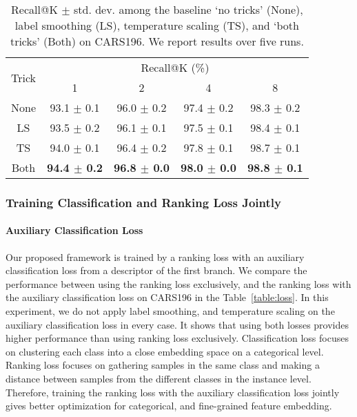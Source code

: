 \documentclass[10pt,twocolumn,letterpaper]{article}
\begin{document}
\begin{CJK}{UTF8}{mj}
\begin{table}[t!]
\begin{center}

\begin{adjustbox}{width=.95\columnwidth,center}
\begin{tabular}{c|cccc}
\hline
\multirow{2}{*}{Trick} & \multicolumn{4}{c}{Recall@K (\%)}                     \\ \cline{2-5} 
                       & 1          & 2          & 4          & 8          \\ \hline\hline
None                   & 93.1 $\pm$ 0.1 & 96.0 $\pm$ 0.2 & 97.4 $\pm$ 0.2 & 98.3 $\pm$ 0.2 \\
LS                     & 93.5 $\pm$ 0.2 & 96.1 $\pm$ 0.1 & 97.5 $\pm$ 0.1 & 98.4 $\pm$ 0.1 \\
TS                     & 94.0 $\pm$ 0.1 & 96.4 $\pm$ 0.2 & 97.8 $\pm$ 0.1 & 98.7 $\pm$ 0.1 \\
Both                   & \textbf{94.4 $\pm$ 0.2} & \textbf{96.8 $\pm$ 0.0} & \textbf{98.0 $\pm$ 0.0} & \textbf{98.8 $\pm$ 0.1} \\ \hline
\end{tabular}
\end{adjustbox}


\end{center}
\caption{Recall@K $\pm$ std. dev. among the baseline `no tricks' (None), label smoothing (LS), temperature scaling (TS), and `both tricks' (Both) on CARS196.
We report results over five runs.}
\label{table:tricks}
\end{table}

\subsubsection{Training Classification and Ranking Loss Jointly}


\paragraph{Auxiliary Classification Loss} \label{sec:ranking_loss_and_classification_loss}
Our proposed framework is trained by a ranking loss with an auxiliary classification loss from a descriptor of the first branch.
We compare the performance between using the ranking loss exclusively, and the ranking loss with the auxiliary classification loss on CARS196 in the Table~\ref{table:loss}.
In this experiment, we do not apply label smoothing, and temperature scaling on the auxiliary classification loss in every case.
It shows that using both losses provides higher performance than using ranking loss exclusively.
Classification loss focuses on clustering each class into a close embedding space on a categorical level.
Ranking loss focuses on gathering samples in the same class and making a distance between samples from the different classes in the instance level.
Therefore, training the ranking loss with the auxiliary classification loss jointly gives better optimization for categorical, and fine-grained feature embedding.


\end{CJK}
\end{document}
